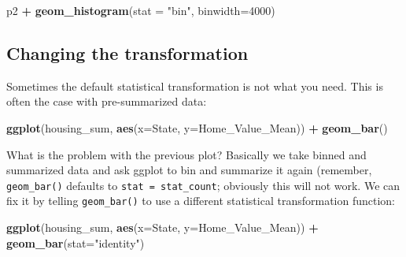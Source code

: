 \documentclass[]{book}
\newenvironment{Shaded}{\begin{snugshade}}{\end{snugshade}}
\newcommand{\DataTypeTok}[1]{\textcolor[rgb]{0.13,0.29,0.53}{#1}}
\newcommand{\DecValTok}[1]{\textcolor[rgb]{0.00,0.00,0.81}{#1}}
\newcommand{\KeywordTok}[1]{\textcolor[rgb]{0.13,0.29,0.53}{\textbf{#1}}}
\newcommand{\NormalTok}[1]{#1}
\newcommand{\OperatorTok}[1]{\textcolor[rgb]{0.81,0.36,0.00}{\textbf{#1}}}
\newcommand{\StringTok}[1]{\textcolor[rgb]{0.31,0.60,0.02}{#1}}
\begin{document}
\begin{Shaded}
\begin{Highlighting}[]
\NormalTok{p2 }\OperatorTok{+}\StringTok{ }\KeywordTok{geom_histogram}\NormalTok{(}\DataTypeTok{stat =} \StringTok{"bin"}\NormalTok{, }\DataTypeTok{binwidth=}\DecValTok{4000}\NormalTok{)}
\end{Highlighting}
\end{Shaded}

\hypertarget{changing-the-transformation}{%
\subsection{Changing the transformation}\label{changing-the-transformation}}

Sometimes the default statistical transformation is not what you need. This is often the case with pre-summarized data:

\begin{Shaded}
\end{Shaded}

\begin{Shaded}
\begin{Highlighting}[]
\KeywordTok{ggplot}\NormalTok{(housing_sum, }\KeywordTok{aes}\NormalTok{(}\DataTypeTok{x=}\NormalTok{State, }\DataTypeTok{y=}\NormalTok{Home_Value_Mean)) }\OperatorTok{+}\StringTok{ }
\StringTok{  }\KeywordTok{geom_bar}\NormalTok{()}
\end{Highlighting}
\end{Shaded}

What is the problem with the previous plot? Basically we take binned and summarized data and ask ggplot to bin and summarize it again (remember, \texttt{geom\_bar()} defaults to \texttt{stat\ =\ stat\_count}; obviously this will not work. We can fix it by telling \texttt{geom\_bar()} to use a different statistical transformation function:

\begin{Shaded}
\begin{Highlighting}[]
\KeywordTok{ggplot}\NormalTok{(housing_sum, }\KeywordTok{aes}\NormalTok{(}\DataTypeTok{x=}\NormalTok{State, }\DataTypeTok{y=}\NormalTok{Home_Value_Mean)) }\OperatorTok{+}\StringTok{ }
\StringTok{  }\KeywordTok{geom_bar}\NormalTok{(}\DataTypeTok{stat=}\StringTok{"identity"}\NormalTok{)}
\end{Highlighting}
\end{Shaded}
\end{document}
